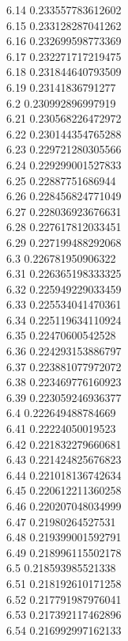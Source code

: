 {6.14	0.233557783612602\\
6.15	0.233128287041262\\
6.16	0.232699598773369\\
6.17	0.232271717219475\\
6.18	0.231844640793509\\
6.19	0.23141836791277\\
6.2	0.230992896997919\\
6.21	0.230568226472972\\
6.22	0.230144354765288\\
6.23	0.229721280305566\\
6.24	0.229299001527833\\
6.25	0.22887751686944\\
6.26	0.228456824771049\\
6.27	0.228036923676631\\
6.28	0.227617812033451\\
6.29	0.227199488292068\\
6.3	0.226781950906322\\
6.31	0.226365198333325\\
6.32	0.225949229033459\\
6.33	0.225534041470361\\
6.34	0.225119634110924\\
6.35	0.22470600542528\\
6.36	0.224293153886797\\
6.37	0.223881077972072\\
6.38	0.223469776160923\\
6.39	0.223059246936377\\
6.4	0.222649488784669\\
6.41	0.22224050019523\\
6.42	0.221832279660681\\
6.43	0.221424825676823\\
6.44	0.221018136742634\\
6.45	0.220612211360258\\
6.46	0.220207048034999\\
6.47	0.21980264527531\\
6.48	0.219399001592791\\
6.49	0.218996115502178\\
6.5	0.218593985521338\\
6.51	0.218192610171258\\
6.52	0.217791987976041\\
6.53	0.217392117462896\\
6.54	0.216992997162133\\
}
